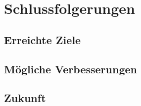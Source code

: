 \section{Schlussfolgerungen}

\subsection{Erreichte Ziele}
 
\subsection{Mögliche Verbesserungen}

 \subsection{Zukunft}
